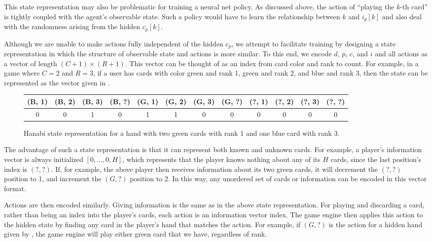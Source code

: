 This state representation may also be problematic for training a neural net
policy. As discussed above, the action of ``playing the $k$-th card'' is
tightly coupled with the agent's observable state. Such a policy would have to
learn the relationship between $k$ and $i_p[k]$ and also deal with the
randomness arising from the hidden $c_p[k]$.

Although we are unable to make actions fully independent of the hidden $c_p$,
we attempt to facilitate training by designing a state representation in which
the structure of observable state and actions is more similar. To this end, we
encode $d$, $p$, $c$, and $i$ and all actions as a vector of length $(C + 1)
\times (R + 1)$. This vector can be thought of as an index from card color and
rank to count. For example, in a game where $C = 2$ and $R = 3$, if a user has
cards with color green and rank 1, green and rank 2, and blue and rank 3, then
the state can be represented as the vector given in .

\begin{figure}[ht]
    \centering
    \begin{tabular}{c | c | c | c | c | c | c | c | c | c | c | c}
        (B, 1) & (B, 2) & (B, 3) & (B, ?) & (G, 1) & (G, 2) & (G, 3) & (G, ?) & (?, 1) & (?, 2) & (?, 3) & (?, ?) \\\hline
        0 & 0 & 1 & 0 & 1 & 1 & 0 & 0 & 0 & 0 & 0 & 0
    \end{tabular}
    \caption{Hanabi state representation for a hand with two green cards with
    rank 1 and one blue card with rank 3.}
    \label{fig:flattenedstate}
\end{figure}

The advantage of such a state representation is that it can represent both
known and unknown cards. For example, a player's information vector is always
initialized $[0, \dots, 0, H]$, which represents that the player knows nothing
about any of its $H$ cards, since the last position's index is $(?, ?)$. If,
for example, the above player then receives information about its two green
cards, it will decrement the $(?, ?)$ position to 1, and increment the $(G, ?)$
position to 2. In this way, any unordered set of cards or information can be
encoded in this vector format.

Actions are then encoded similarly. Giving information is the same as in the
above state representation. For playing and discarding a card, rather than
being an index into the player's cards, each action is an information vector
index.  The game engine then applies this action to the hidden state by finding
any card in the player's hand that matches the action.  For example, if $(G,
?)$ is the action for a hidden hand given by , the game
engine will play either green card that we have, regardless of rank.

